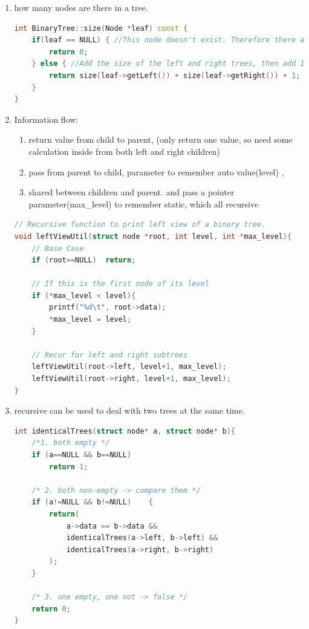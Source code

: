 \documentclass[a4paper,12pt,twoside]{book}
\begin{document}
\begin{enumerate}
\begin{lstlisting}[frame=single, language=c++]
\end{lstlisting}

\item how many nodes are there in a tree. 
\begin{lstlisting}[frame=single, language=c++]
int BinaryTree::size(Node *leaf) const {
    if(leaf == NULL) { //This node doesn't exist. Therefore there are no nodes in this 'subtree'
        return 0;
    } else { //Add the size of the left and right trees, then add 1 (which is the current node)
        return size(leaf->getLeft()) + size(leaf->getRight()) + 1;
    }
}
\end{lstlisting}

\item Information flow:
 \begin{enumerate}
\item  return value from child to parent, (only return one value, so need some calculation inside from both left and right children)
\item pass from parent to child, parameter to remember auto value(level) , 
\item shared between children and parent. and pass a pointer parameter(max\_level) to remember static, which all recursive 
 \end{enumerate}
 
\begin{lstlisting}[frame=single, language=c++]
// Recursive function to print left view of a binary tree.
void leftViewUtil(struct node *root, int level, int *max_level){
    // Base Case
    if (root==NULL)  return;
 
    // If this is the first node of its level
    if (*max_level < level){
        printf("%d\t", root->data);
        *max_level = level;
    }
    
    // Recur for left and right subtrees
    leftViewUtil(root->left, level+1, max_level);
    leftViewUtil(root->right, level+1, max_level);
}
 \end{lstlisting}

\item recursive can be used to deal with two trees at the same time. 
\begin{lstlisting}[frame=single, language=c++]
int identicalTrees(struct node* a, struct node* b){
    /*1. both empty */
    if (a==NULL && b==NULL)
        return 1;
         
    /* 2. both non-empty -> compare them */
    if (a!=NULL && b!=NULL)    {
        return(
            a->data == b->data &&
            identicalTrees(a->left, b->left) &&
            identicalTrees(a->right, b->right)
        );
    } 
        
    /* 3. one empty, one not -> false */
    return 0;
} 
\end{lstlisting}


\end{enumerate}
\end{document}
